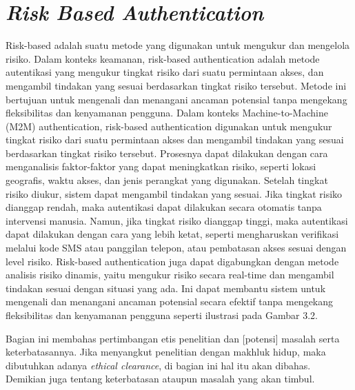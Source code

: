 \section{\textit{Risk Based Authentication}}
Risk-based adalah suatu metode yang digunakan untuk mengukur dan
mengelola risiko. Dalam konteks keamanan, risk-based authentication adalah metode autentikasi yang mengukur tingkat risiko dari suatu permintaan akses, dan mengambil tindakan yang sesuai berdasarkan tingkat risiko tersebut. Metode ini bertujuan untuk mengenali dan menangani ancaman potensial tanpa mengekang fleksibilitas dan kenyamanan pengguna.
Dalam konteks Machine-to-Machine (M2M) authentication, risk-based authentication digunakan untuk mengukur tingkat risiko dari suatu permintaan akses dan mengambil tindakan yang sesuai berdasarkan tingkat risiko tersebut.
Prosesnya dapat dilakukan dengan cara menganalisis faktor-faktor yang dapat meningkatkan risiko, seperti lokasi geografis, waktu akses, dan jenis perangkat yang digunakan.
Setelah tingkat risiko diukur, sistem dapat mengambil tindakan yang sesuai. Jika tingkat risiko dianggap rendah, maka autentikasi dapat dilakukan secara otomatis tanpa intervensi manusia. Namun, jika tingkat risiko dianggap tinggi, maka autentikasi dapat dilakukan dengan cara yang lebih ketat, seperti mengharuskan verifikasi melalui kode SMS atau panggilan telepon, atau pembatasan akses sesuai dengan level risiko.
Risk-based authentication juga dapat digabungkan dengan metode analisis risiko dinamis, yaitu mengukur risiko secara real-time dan mengambil tindakan sesuai dengan situasi yang ada. Ini dapat membantu sistem untuk mengenali dan menangani ancaman potensial secara efektif tanpa mengekang fleksibilitas dan kenyamanan pengguna seperti ilustrasi pada Gambar 3.2.

Bagian ini membahas pertimbangan etis penelitian dan [potensi] masalah serta
keterbatasannya. Jika menyangkut penelitian dengan makhluk hidup, maka dibutuhkan adanya \textit{ethical clearance}, di bagian ini hal itu akan dibahas. Demikian juga tentang keterbatasan ataupun masalah yang akan timbul.
